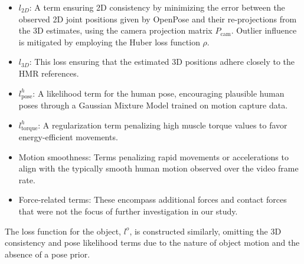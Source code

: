 \begin{itemize}
    \item 
        \(l_{2D}\): A term ensuring 2D consistency by minimizing the error between the observed 2D joint positions given by OpenPose and 
        their re-projections from the 3D estimates, using the camera projection matrix \(P_{\text{cam}}\). Outlier influence is mitigated 
        by employing the Huber loss function \(\rho\).
    \item 
        \(l_{3D}\): This loss ensuring that the estimated 3D positions adhere closely to the HMR references.
    \item 
        \(l_{\text{pose}}^h\): A likelihood term for the human pose, encouraging plausible human poses through a Gaussian Mixture Model 
        trained on motion capture data.
    \item
        \(l_{\text{torque}}^h\): A regularization term penalizing high muscle torque values to favor energy-efficient movements.
    \item 
        Motion smoothness: Terms penalizing rapid movements or accelerations to align with the typically smooth human motion observed over 
        the video frame rate.
    \item
        Force-related terms: These encompass additional forces and contact forces that were not the focus of further investigation in our 
        study.
\end{itemize}

The loss function for the object, \(l^o\), is constructed similarly, omitting the 3D consistency and pose likelihood terms due to the nature 
of object motion and the absence of a pose prior.